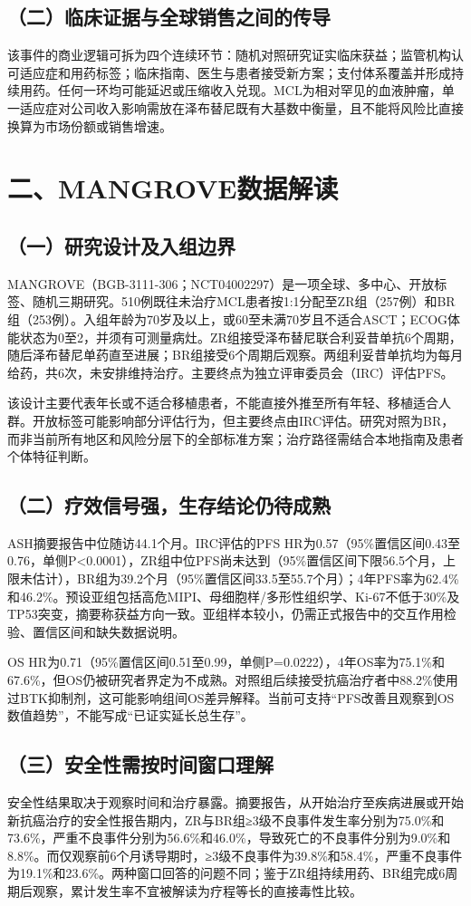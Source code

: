 \documentclass[a4paper,10pt,fontset=none]{ctexart}
\begin{document}
\subsection*{（二）临床证据与全球销售之间的传导}
该事件的商业逻辑可拆为四个连续环节：随机对照研究证实临床获益；监管机构认可适应症和用药标签；临床指南、医生与患者接受新方案；支付体系覆盖并形成持续用药。任何一环均可能延迟或压缩收入兑现。MCL为相对罕见的血液肿瘤，单一适应症对公司收入影响需放在泽布替尼既有大基数中衡量，且不能将风险比直接换算为市场份额或销售增速。

\section*{二、MANGROVE数据解读}
\subsection*{（一）研究设计及入组边界}
MANGROVE（BGB-3111-306；NCT04002297）是一项全球、多中心、开放标签、随机三期研究。510例既往未治疗MCL患者按1:1分配至ZR组（257例）和BR组（253例）。入组年龄为70岁及以上，或60至未满70岁且不适合ASCT；ECOG体能状态为0至2，并须有可测量病灶。ZR组接受泽布替尼联合利妥昔单抗6个周期，随后泽布替尼单药直至进展；BR组接受6个周期后观察。两组利妥昔单抗均为每月给药，共6次，未安排维持治疗。主要终点为独立评审委员会（IRC）评估PFS。

该设计主要代表年长或不适合移植患者，不能直接外推至所有年轻、移植适合人群。开放标签可能影响部分评估行为，但主要终点由IRC评估。研究对照为BR，而非当前所有地区和风险分层下的全部标准方案；治疗路径需结合本地指南及患者个体特征判断。

\subsection*{（二）疗效信号强，生存结论仍待成熟}
ASH摘要报告中位随访44.1个月。IRC评估的PFS HR为0.57（95\%置信区间0.43至0.76，单侧P<0.0001），ZR组中位PFS尚未达到（95\%置信区间下限56.5个月，上限未估计），BR组为39.2个月（95\%置信区间33.5至55.7个月）；4年PFS率为62.4\%和46.2\%。预设亚组包括高危MIPI、母细胞样/多形性组织学、Ki-67不低于30\%及TP53突变，摘要称获益方向一致。亚组样本较小，仍需正式报告中的交互作用检验、置信区间和缺失数据说明。

OS HR为0.71（95\%置信区间0.51至0.99，单侧P=0.0222），4年OS率为75.1\%和67.6\%，但OS仍被研究者界定为不成熟。对照组后续接受抗癌治疗者中88.2\%使用过BTK抑制剂，这可能影响组间OS差异解释。当前可支持“PFS改善且观察到OS数值趋势”，不能写成“已证实延长总生存”。

\subsection*{（三）安全性需按时间窗口理解}
安全性结果取决于观察时间和治疗暴露。摘要报告，从开始治疗至疾病进展或开始新抗癌治疗的安全性报告期内，ZR与BR组≥3级不良事件发生率分别为75.0\%和73.6\%，严重不良事件分别为56.6\%和46.0\%，导致死亡的不良事件分别为9.0\%和8.8\%。而仅观察前6个月诱导期时，≥3级不良事件为39.8\%和58.4\%，严重不良事件为19.1\%和23.6\%。两种窗口回答的问题不同；鉴于ZR组持续用药、BR组完成6周期后观察，累计发生率不宜被解读为疗程等长的直接毒性比较。
\end{document}
